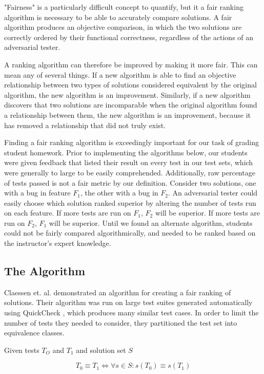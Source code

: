 \documentclass[11pt,twoside]{article}
\let\cite=\citep
\begin{document}
"Fairness" is a particularly difficult concept to quantify, but it a fair ranking algorithm is necessary to be able to accurately compare solutions. A fair algorithm produces an objective comparison, in which the two solutions are correctly ordered by their functional correctness, regardless of the actions of an adversarial tester.

A ranking algorithm can therefore be improved by making it more fair. This can mean any of several things. If a new algorithm is able to find an objective relationship between two types of solutions considered equivalent by the original algorithm, the new algorithm is an improvement. Similarly, if a new algorithm discovers that two solutions are incomparable when the original algorithm found a relationship between them, the new algorithm is an improvement, because it has removed a relationship that did not truly exist.

Finding a fair ranking algorithm is exceedingly important for our task of grading student homework. Prior to implementing the algorithms below, our students were given feedback that listed their result on every test in our test sets, which were generally to large to be easily comprehended. Additionally, raw percentage of tests passed is not a fair metric by our definition. Consider two solutions, one with a bug in feature $F_1$, the other with a bug in $F_2$. An adversarial tester could easily choose which solution ranked superior by altering the number of tests run on each feature. If more tests are run on $F_1$, $F_2$ will be superior. If more tests are run on $F_2$, $F_1$ will be superior. Until we found an alternate algorithm, students could not be fairly compared algorithmically, and needed to be ranked based on the instructor's expert knowledge.

\subsection{The Algorithm}
Claessen et. al. demonstrated an algorithm for creating a fair ranking of solutions\cite{Claessen}. Their algorithm was run on large test suites generated automatically using QuickCheck \cite{QuickCheck}, which produces many similar test cases. In order to limit the number of tests they needed to consider, they partitioned the test set into equivalence classes.

\centerline{Given tests $T_O$ and $T_1$ and solution set $S$}
$$ T_0 \equiv T_1 \iff \forall s \in S : s(T_0) \equiv s(T_1) $$
\end{document}
